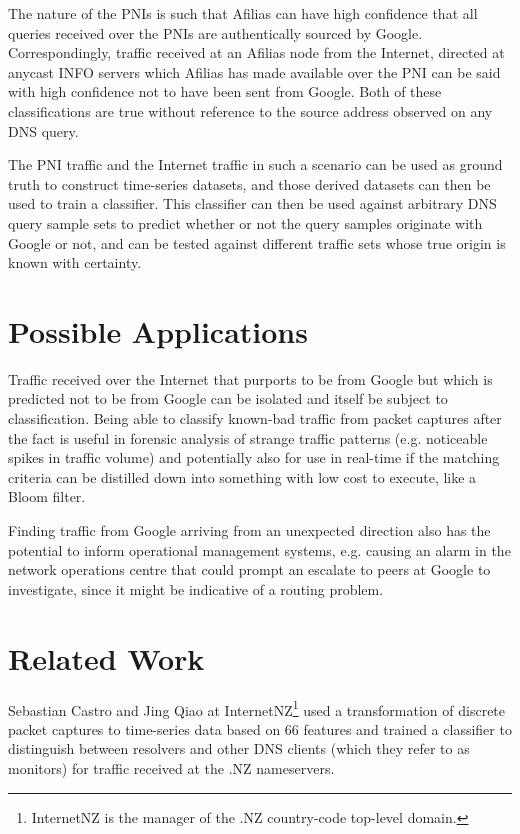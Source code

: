 \documentclass[9pt,technote,letterpaper]{IEEEtran}
\begin{document}
The nature of the PNIs is such that Afilias can have high confidence that all queries received over the PNIs are authentically sourced by Google. Correspondingly, traffic received at an Afilias node from the Internet, directed at anycast INFO servers which Afilias has made available over the PNI can be said with high confidence not to have been sent from Google. Both of these classifications are true without reference to the source address observed on any DNS query.

The PNI traffic and the Internet traffic in such a scenario can be used as ground truth to construct time-series datasets, and those derived datasets can then be used to train a classifier. This classifier can then be used against arbitrary DNS query sample sets to predict whether or not the query samples originate with Google or not, and can be tested against different traffic sets whose true origin is known with certainty.

\section{Possible Applications}
Traffic received over the Internet that purports to be from Google but which is predicted not to be from Google can be isolated and itself be subject to classification. Being able to classify known-bad traffic from packet captures after the fact is useful in forensic analysis of strange traffic patterns (e.g. noticeable spikes in traffic volume) and potentially also for use in real-time if the matching criteria can be distilled down into something with low cost to execute, like a Bloom filter.

Finding traffic from Google arriving from an unexpected direction also has the potential to inform operational management systems, e.g. causing an alarm in the network operations centre that could prompt an escalate to peers at Google to investigate, since it might be indicative of a routing problem.

\section{Related Work}
Sebastian Castro and Jing Qiao at InternetNZ\footnote{InternetNZ is the manager of the .NZ country-code top-level domain.} used a transformation of discrete packet captures to time-series data based on 66 features and trained a classifier to distinguish between resolvers and other DNS clients (which they refer to as monitors) for traffic received at the .NZ nameservers\cite{CastroQiao}.
\end{document}
